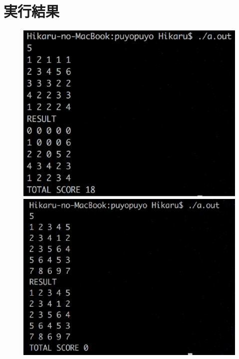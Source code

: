 \documentclass{jarticle}
\begin{document}
\newpage
\section{実行結果}
\begin{figure}[!h]
\begin{center}
\includegraphics[scale=0.38]{c_result1.eps}
\includegraphics[scale=0.565]{c_result2.eps}
\newpage

\end{center}
\end{figure}
\end{document}
